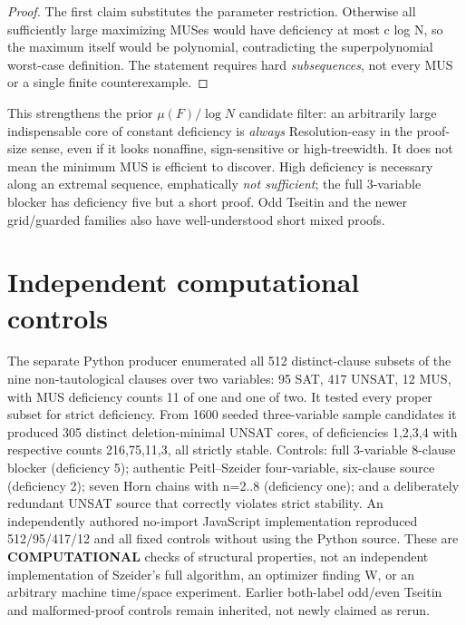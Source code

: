 \documentclass[11pt]{article}
\begin{document}
\begin{proof}
The first claim substitutes the parameter restriction. Otherwise all sufficiently large maximizing MUSes would have deficiency at most c log N, so the maximum itself would be polynomial, contradicting the superpolynomial worst-case definition. The statement requires hard \emph{subsequences}, not every MUS or a single finite counterexample.
\end{proof}
This strengthens the prior $\mu(F)/\log N$ candidate filter: an arbitrarily large indispensable core of constant deficiency is \emph{always} Resolution-easy in the proof-size sense, even if it looks nonaffine, sign-sensitive or high-treewidth. It does not mean the minimum MUS is efficient to discover. High deficiency is necessary along an extremal sequence, emphatically \emph{not sufficient}; the full 3-variable blocker has deficiency five but a short proof. Odd Tseitin and the newer grid/guarded families also have well-understood short mixed proofs.

\section*{Independent computational controls}
The separate Python producer enumerated all 512 distinct-clause subsets of the nine non-tautological clauses over two variables: 95 SAT, 417 UNSAT, 12 MUS, with MUS deficiency counts 11 of one and one of two. It tested every proper subset for strict deficiency. From 1600 seeded three-variable sample candidates it produced 305 distinct deletion-minimal UNSAT cores, of deficiencies 1,2,3,4 with respective counts 216,75,11,3, all strictly stable. Controls: full 3-variable 8-clause blocker (deficiency 5); authentic Peitl--Szeider four-variable, six-clause source (deficiency 2); seven Horn chains with n=2..8 (deficiency one); and a deliberately redundant UNSAT source that correctly violates strict stability. An independently authored no-import JavaScript implementation reproduced 512/95/417/12 and all fixed controls without using the Python source. These are \textbf{COMPUTATIONAL} checks of structural properties, not an independent implementation of Szeider's full algorithm, an optimizer finding W, or an arbitrary machine time/space experiment. Earlier both-label odd/even Tseitin and malformed-proof controls remain inherited, not newly claimed as rerun.
\end{document}
